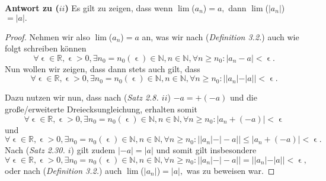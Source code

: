 \begin{lsg}
    \textbf{Antwort zu ($ii$)}
        Es gilt zu zeigen, dass wenn $\lim$($a_n$)$=a,$ dann $\lim$($|a_n|$)$=|a|.$
    
    \begin{proof}
        Nehmen wir also $\lim$($a_n$)$=a$ an, was wir nach (\textit{Definition 3.2.}) auch wie folgt schreiben k\"onnen $$\forall \upvarepsilon \in \mathbb{R}, \upvarepsilon > 0, \exists n_0 = n_0(\upvarepsilon) \in \mathbb{N}, n \in \mathbb{N}, \forall n \ge n_0 : |a_n - a| < \upvarepsilon.$$ 
        Nun wollen wir zeigen, dass dann stets auch gilt, dass$$\forall \upvarepsilon \in \mathbb{R}, \upvarepsilon > 0, \exists n_0 = n_0(\upvarepsilon) \in \mathbb{N}, n \in \mathbb{N}, \forall n \ge n_0 : ||a_n| - |a|| < \upvarepsilon.$$
    
        Dazu nutzen wir nun, dass nach (\textit{Satz 2.8. $ii$}) $-a = +(-a)$ und die gro{\ss}e/erweiterte Dreiecksungleichung, erhalten somit $$\forall \upvarepsilon \in \mathbb{R}, \upvarepsilon > 0, \exists n_0 = n_0(\upvarepsilon) \in \mathbb{N}, n \in \mathbb{N}, \forall n \ge n_0 : |a_n + (-a)| < \upvarepsilon$$und $$\forall \upvarepsilon \in \mathbb{R}, \upvarepsilon > 0, \exists n_0 = n_0(\upvarepsilon) \in \mathbb{N}, n \in \mathbb{N}, \forall n \ge n_0 : ||a_n|-|-a|| \le |a_n + (-a)| < \upvarepsilon.$$Nach (\textit{Satz 2.30. $i$}) gilt zudem $|-a| = |a|$ und somit gilt insbesondere $$\forall \upvarepsilon \in \mathbb{R}, \upvarepsilon > 0, \exists n_0 = n_0(\upvarepsilon) \in \mathbb{N}, n \in \mathbb{N}, \forall n \ge n_0 : ||a_n|-|-a|| = ||a_n|-|a|| < \upvarepsilon,$$oder nach (\textit{Definition 3.2.}) auch $\lim$($|a_n|$)$=|a|,$ was zu beweisen war.
    \end{proof}
\end{lsg}


